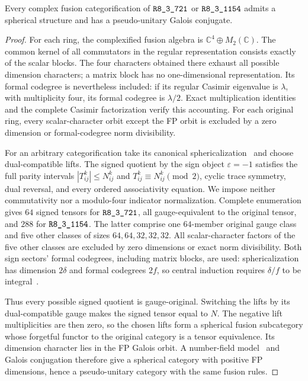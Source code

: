 \begin{proposition}
Every complex fusion categorification of $\sha{R8_3_721}$ or $\sha{R8_3_1154}$
admits a spherical structure and has a pseudo-unitary Galois conjugate.
\end{proposition}
\begin{proof}
For each ring, the complexified fusion algebra is
$\mathbb C^4\oplus M_2(\mathbb C)$. The common kernel of all commutators
in the regular representation consists exactly of the scalar blocks.
The four characters obtained there exhaust all possible dimension
characters; a matrix block has no one-dimensional representation.
Its formal codegree is nevertheless included: if its regular Casimir
eigenvalue is $\lambda$, with multiplicity four, its formal codegree is
$\lambda/2$. Exact multiplication identities and the complete Casimir
factorization verify this accounting. For each original ring, every scalar-character orbit
except the FP orbit is excluded by a zero dimension or formal-codegree
norm divisibility.

For an arbitrary categorification take its canonical sphericalization~\cite[Section~5.1]{OstrikPiv3}
and choose dual-compatible lifts. The signed quotient by the sign object
$\varepsilon=-1$ satisfies the full parity intervals
$|T_{ij}^k|\leq N_{ij}^k$ and $T_{ij}^k\equiv N_{ij}^k\pmod2$,
cyclic trace symmetry, dual reversal, and every ordered associativity
equation. We impose neither commutativity nor a modulo-four indicator
normalization. Complete enumeration gives $64$ signed tensors for
$\sha{R8_3_721}$, all gauge-equivalent to the original tensor, and $288$
for $\sha{R8_3_1154}$. The latter comprise one $64$-member original gauge
class and five other classes of sizes $64,64,32,32,32$.
All scalar-character factors of the five other classes are excluded by
zero dimensions or exact norm divisibility. Both sign sectors' formal
codegrees, including matrix blocks, are used: sphericalization has
dimension $2\delta$ and formal codegrees $2f$, so central induction
requires $\delta/f$ to be integral~\cite[Theorem~2.13 and Corollary~2.14]{OstrikPiv3}.

Thus every possible signed quotient is gauge-original. Switching the
lifts by its dual-compatible gauge makes the signed tensor equal to
$N$. The negative lift multiplicities are then zero, so the chosen
lifts form a spherical fusion subcategory whose forgetful functor to
the original category is a tensor equivalence. Its dimension character
lies in the FP Galois orbit. A number-field model~\cite[Theorem~2.30 and the following remark]{ENO} and Galois conjugation
therefore give a spherical category with positive FP dimensions, hence
a pseudo-unitary category with the same fusion rules.
\end{proof}

